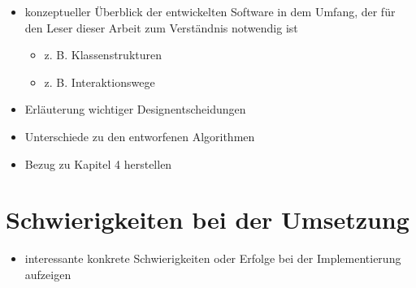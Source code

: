 \documentclass[../main/thesis.tex]{subfiles}
\begin{document}



\begin{itemize}
	\item konzeptueller Überblick der entwickelten Software in dem Umfang, der für den Leser dieser Arbeit zum Verständnis notwendig ist
	\begin{itemize}
		\item z. B. Klassenstrukturen
		\item z. B. Interaktionswege
	\end{itemize}
	\item Erläuterung wichtiger Designentscheidungen
	\item Unterschiede zu den entworfenen Algorithmen
	\item Bezug zu Kapitel 4 herstellen
\end{itemize}



\section{Schwierigkeiten bei der Umsetzung}
\label{ch:impl-difficulties}





\begin{itemize}
	\item interessante konkrete Schwierigkeiten oder Erfolge bei der Implementierung aufzeigen
\end{itemize}



\end{document}
